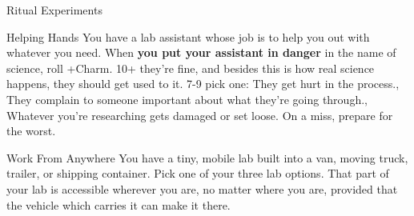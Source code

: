 {\begin{move}{Ritual Experiments}
\end{move}%
\br[1mm]
%
\begin{move}{Helping Hands}
You have a lab assistant whose job is to help you out with whatever you need.  When \textbf{you put your assistant in danger} in the name of science, roll +Charm.  10+ they’re fine, and besides this is how real science happens, they should get used to it.  7-9 pick one:
\holdoptions%
    {{They get hurt in the process.},
    {They complain to someone important about what they’re going through.},
    {Whatever you’re researching gets damaged or set loose.}}%
On a miss, prepare for the worst.
\end{move}%
\br[1mm]
%
\begin{move}{Work From Anywhere}
You have a tiny, mobile lab built into a van, moving truck, trailer, or shipping container.  Pick one of your three lab options.  That part of your lab is accessible wherever you are, no matter where you are, provided that the vehicle which carries it can make it there.
\end{move}%
\br[1mm]
%
%
}\pagebreak%
%
